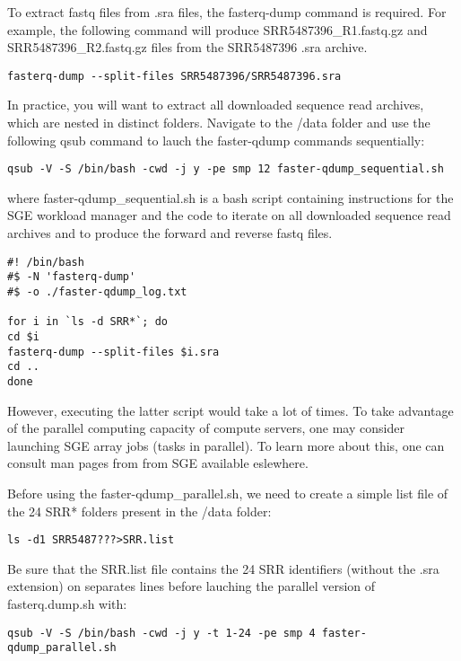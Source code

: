 To extract fastq files from .sra files, the fasterq-dump command is required. For example, the following command will produce SRR5487396\_R1.fastq.gz and SRR5487396\_R2.fastq.gz files from the SRR5487396 .sra archive.

\begin{verbatim}
fasterq-dump --split-files SRR5487396/SRR5487396.sra
\end{verbatim}

In practice, you will want to extract all downloaded sequence read archives, which are nested in distinct folders. Navigate to the /data folder and use the following qsub command to lauch the faster-qdump commands sequentially:

\begin{verbatim}
qsub -V -S /bin/bash -cwd -j y -pe smp 12 faster-qdump_sequential.sh
\end{verbatim}

where faster-qdump\_sequential.sh is a bash script containing instructions for the SGE workload manager and the code to iterate on all downloaded sequence read archives and to produce the forward and reverse fastq files.

\begin{verbatim}
#! /bin/bash
#$ -N 'fasterq-dump'
#$ -o ./faster-qdump_log.txt
	
for i in `ls -d SRR*`; do
cd $i
fasterq-dump --split-files $i.sra
cd ..
done
\end{verbatim}


However, executing the latter script would take a lot of times. To take advantage of the parallel computing capacity of compute servers, one may consider launching SGE array jobs (tasks in parallel). To learn more about this, one can consult man pages from from SGE available eslewhere.

Before using the faster-qdump\_parallel.sh, we need to create a simple list file of the 24 SRR* folders present in the /data folder:

\begin{verbatim}
ls -d1 SRR5487???>SRR.list
\end{verbatim}

Be sure that the SRR.list file contains the 24 SRR identifiers (without the .sra extension) on separates lines before lauching the parallel version of fasterq.dump.sh with:
\begin{verbatim}
qsub -V -S /bin/bash -cwd -j y -t 1-24 -pe smp 4 faster-qdump_parallel.sh
\end{verbatim}


